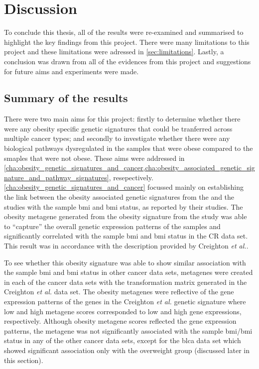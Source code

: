 \chapter{Discussion}
\label{cha:discussion}

To conclude this thesis, all of the results were re-examined and summarised to highlight the key findings from this project.
There were many limitations to this project and these limitations were adressed in \cref{sec:limitations}.
Lastly, a conclusion was drawn from all of the evidences from this project and suggestions for future aims and experiments were made.


\section{Summary of the results}
\label{sec:summary_of_the_results}


There were two main aims for this project: firstly to determine whether there were any obesity specific genetic signatures that could be tranferred across multiple cancer types; and secondly to investigate whether there were any biological pathways dysregulated in the samples that were obese compared to the smaples that were not obese.
These aims were addressed in \cref{cha:obesity_genetic_signatures_and_cancer,cha:obesity_associated_genetic_signature_and_pathway_signatures}, resepectively.
\\

\noindent
\cref{cha:obesity_genetic_signatures_and_cancer} focussed mainly on establishing the link between the obesity associated genetic signatures from the \citet{Creighton2012} and the \citet{Fuentes-Mattei2014} studies with the sample \gls{bmi} and \gls{bmi} status, as reported by their studies.
The obesity metagene generated from the obesity signature from the \citet{Creighton2012} study was able to ``capture'' the overall genetic expression patterns of the samples and significantly correlated with the sample \gls{bmi} and \gls{bmi} status in the CR data set.
This result was in accordance with the description provided by Creighton \textit{et al.}.

To see whether this obesity signature was able to show similar association with the sample \gls{bmi} and \gls{bmi} status in other cancer data sets, metagenes were created in each of the cancer data sets with the transformation matrix generated in the Creighton \textit{et al.} data set.
The obesity metagenes were reflective of the gene expression patterns of the genes in the Creighton \textit{et al.} genetic signature where low and high metagene scores  corresponded to low and high gene expressions, respectively.
Although obesity metagene scores reflected the gene expression patterns, the metagene was not significantly associated with the sample \gls{bmi}/\gls{bmi} status in any of the other cancer data sets, except for  the \gls{blca} data set which showed significant association only with the overweight group (discussed later in this section).

